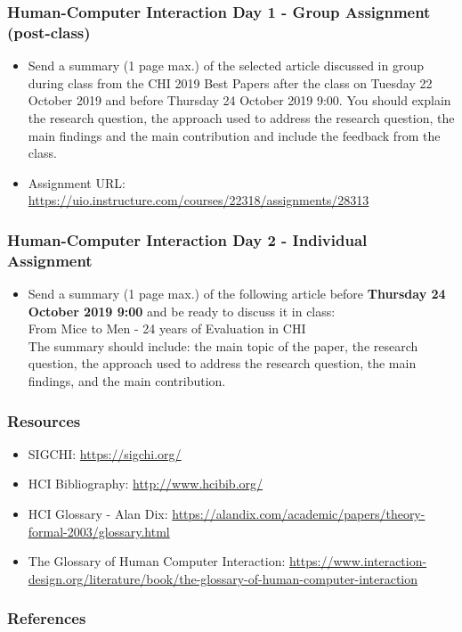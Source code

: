 \documentclass[screen, aspectratio=169]{beamer}
\begin{document}
%
\begin{frame}
\frametitle{Human-Computer Interaction Day 1 - Group Assignment (post-class)}
\begin{itemize}
\item Send a summary (1 page max.) of the selected article discussed in group during class from the CHI 2019 Best Papers after the class on Tuesday 22 October 2019 and before Thursday 24 October 2019 9:00. 
You should explain the research question, the approach used to address the research question, the main findings and the main contribution and include the feedback from the class.
\item Assignment URL: \url{https://uio.instructure.com/courses/22318/assignments/28313}
\end{itemize}
\end{frame}
%
\begin{frame}
\frametitle{Human-Computer Interaction Day 2 - Individual Assignment}
\begin{itemize}
\item Send a summary (1 page max.) of the following article before \textbf{Thursday 24 October 2019 9:00} and be ready to discuss it in class:\\ 
From Mice to Men - 24 years of Evaluation in CHI~\cite{Barkhuus.Rode.2007.evalchi}\\
The summary should include: 
the main topic of the paper,
the research question,
the approach used to address the research question,
the main findings, and
the main contribution.
\end{itemize}
\end{frame}
%
\begin{frame}
\frametitle{Resources}
\begin{itemize}
\item SIGCHI: \url{https://sigchi.org/}
\item HCI Bibliography: \url{http://www.hcibib.org/}
\item HCI Glossary - Alan Dix: \url{https://alandix.com/academic/papers/theory-formal-2003/glossary.html}
\item The Glossary of Human Computer Interaction: \url{https://www.interaction-design.org/literature/book/the-glossary-of-human-computer-interaction}
\end{itemize}
\end{frame}
%
\begin{frame}[shrink=20]
  \frametitle{References}
  \printbibliography
\end{frame}
%
\end{document}
